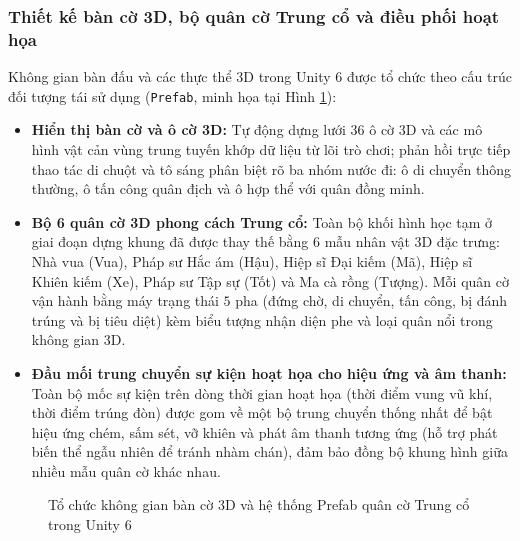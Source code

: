 \subsubsection{Thiết kế bàn cờ 3D, bộ quân cờ Trung cổ và điều phối hoạt họa}
Không gian bàn đấu và các thực thể 3D trong Unity 6 được tổ chức theo cấu trúc đối tượng tái sử dụng (\texttt{Prefab}, minh họa tại Hình \ref{fig:unity_view_prefabs}):
\begin{itemize}
    \item \textbf{Hiển thị bàn cờ và ô cờ 3D:} Tự động dựng lưới $36$ ô cờ 3D và các mô hình vật cản vùng trung tuyến khớp dữ liệu từ lõi trò chơi; phản hồi trực tiếp thao tác di chuột và tô sáng phân biệt rõ ba nhóm nước đi: ô di chuyển thông thường, ô tấn công quân địch và ô hợp thể với quân đồng minh.
    \item \textbf{Bộ 6 quân cờ 3D phong cách Trung cổ:} Toàn bộ khối hình học tạm ở giai đoạn dựng khung đã được thay thế bằng $6$ mẫu nhân vật 3D đặc trưng: Nhà vua (Vua), Pháp sư Hắc ám (Hậu), Hiệp sĩ Đại kiếm (Mã), Hiệp sĩ Khiên kiếm (Xe), Pháp sư Tập sự (Tốt) và Ma cà rồng (Tượng). Mỗi quân cờ vận hành bằng máy trạng thái $5$ pha (đứng chờ, di chuyển, tấn công, bị đánh trúng và bị tiêu diệt) kèm biểu tượng nhận diện phe và loại quân nổi trong không gian 3D.
    \item \textbf{Đầu mối trung chuyển sự kiện hoạt họa cho hiệu ứng và âm thanh:} Toàn bộ mốc sự kiện trên dòng thời gian hoạt họa (thời điểm vung vũ khí, thời điểm trúng đòn) được gom về một bộ trung chuyển thống nhất để bật hiệu ứng chém, sấm sét, vỡ khiên và phát âm thanh tương ứng (hỗ trợ phát biến thể ngẫu nhiên để tránh nhàm chán), đảm bảo đồng bộ khung hình giữa nhiều mẫu quân cờ khác nhau.
\end{itemize}

\begin{figure}[H]
    \centering
    \caption{Tổ chức không gian bàn cờ 3D và hệ thống Prefab quân cờ Trung cổ trong Unity 6}
    \label{fig:unity_view_prefabs}
\end{figure}

